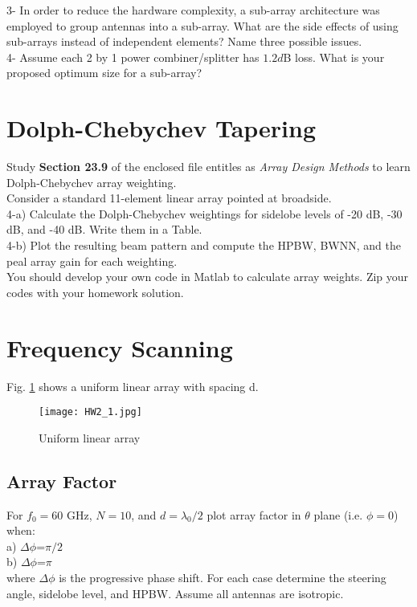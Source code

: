 \documentclass[paper=a4, fontsize=11pt]{scrartcl} %
\numberwithin{equation}{section} %
\numberwithin{figure}{section} %
\numberwithin{table}{section} %
\begin{document}
3- In order to reduce the hardware complexity, a sub-array architecture was employed to group antennas into a sub-array. What are the side effects of using sub-arrays instead of independent elements? Name three possible issues.\\

4- Assume each 2 by 1 power combiner/splitter has $1.2 d$B loss. What is your proposed optimum size for a sub-array?\\

\section{Dolph-Chebychev Tapering}
Study \textbf{Section 23.9} of the enclosed file entitles as \textit{Array Design Methods} to learn Dolph-Chebychev array weighting.\\

Consider a standard 11-element linear array pointed at broadside.\\

4-a) Calculate the Dolph-Chebychev weightings for sidelobe levels of -20 dB, -30 dB, and -40 dB. Write them in a Table.\\

4-b) Plot the resulting beam pattern and compute the HPBW, BWNN, and the peal array gain for each weighting.\\


You should develop your own code in Matlab to calculate array weights. Zip your codes with your homework solution. 

\section{Frequency Scanning}

Fig. \ref{Fig1} shows a uniform linear array with spacing d.

\begin{figure}[h]
\centering
\texttt{[image: HW2\_1.jpg]}
\caption{Uniform linear array}
\label{Fig1}
\end{figure}

\subsection{Array Factor}
For $f_0= 60$ GHz, $N=10$, and $d=\lambda_0/2$ plot array factor in $\theta$ plane (i.e. $\phi=0$) when:\\ 
a) $\Delta\phi$=$\pi/2$\\
b) $\Delta\phi$=$\pi$\\
where $\Delta\phi$ is the progressive phase shift. For each case determine the steering angle, sidelobe level, and HPBW. Assume all antennas are isotropic.\\
\end{document}
